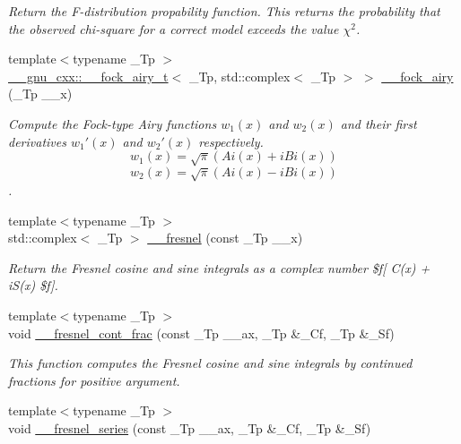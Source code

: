 \begin{DoxyCompactItemize}
\begin{DoxyCompactList}\small\item\em Return the F-\/distribution propability function. This returns the probability that the observed chi-\/square for a correct model exceeds the value $ \chi^2 $. \end{DoxyCompactList}\item 
{\footnotesize template$<$typename \+\_\+\+Tp $>$ }\\\hyperlink{struct____gnu__cxx_1_1____fock__airy__t}{\+\_\+\+\_\+gnu\+\_\+cxx\+::\+\_\+\+\_\+fock\+\_\+airy\+\_\+t}$<$ \+\_\+\+Tp, std\+::complex$<$ \+\_\+\+Tp $>$ $>$ \hyperlink{namespacestd_1_1____detail_a482936d128727bf73a5953639fd3a7e0}{\+\_\+\+\_\+fock\+\_\+airy} (\+\_\+\+Tp \+\_\+\+\_\+x)
\begin{DoxyCompactList}\small\item\em Compute the Fock-\/type Airy functions $ w_1(x) $ and $ w_2(x) $ and their first derivatives $ w_1'(x) $ and $ w_2'(x) $ respectively. \[ w_1(x) = \sqrt{\pi}(Ai(x) + iBi(x)) \] \[ w_2(x) = \sqrt{\pi}(Ai(x) - iBi(x)) \]. \end{DoxyCompactList}\item 
{\footnotesize template$<$typename \+\_\+\+Tp $>$ }\\std\+::complex$<$ \+\_\+\+Tp $>$ \hyperlink{namespacestd_1_1____detail_a322045015cfbde5a45e7718d533de60d}{\+\_\+\+\_\+fresnel} (const \+\_\+\+Tp \+\_\+\+\_\+x)
\begin{DoxyCompactList}\small\item\em Return the Fresnel cosine and sine integrals as a complex number \$f\mbox{[} C(x) + i\+S(x) \$f\mbox{]}. \end{DoxyCompactList}\item 
{\footnotesize template$<$typename \+\_\+\+Tp $>$ }\\void \hyperlink{namespacestd_1_1____detail_aeae8420e2fa1671f004066525adc99b6}{\+\_\+\+\_\+fresnel\+\_\+cont\+\_\+frac} (const \+\_\+\+Tp \+\_\+\+\_\+ax, \+\_\+\+Tp \&\+\_\+\+Cf, \+\_\+\+Tp \&\+\_\+\+Sf)
\begin{DoxyCompactList}\small\item\em This function computes the Fresnel cosine and sine integrals by continued fractions for positive argument. \end{DoxyCompactList}\item 
{\footnotesize template$<$typename \+\_\+\+Tp $>$ }\\void \hyperlink{namespacestd_1_1____detail_aae7775bc46d621e54fb9d994c2f35e2a}{\+\_\+\+\_\+fresnel\+\_\+series} (const \+\_\+\+Tp \+\_\+\+\_\+ax, \+\_\+\+Tp \&\+\_\+\+Cf, \+\_\+\+Tp \&\+\_\+\+Sf)

\end{DoxyCompactItemize}

